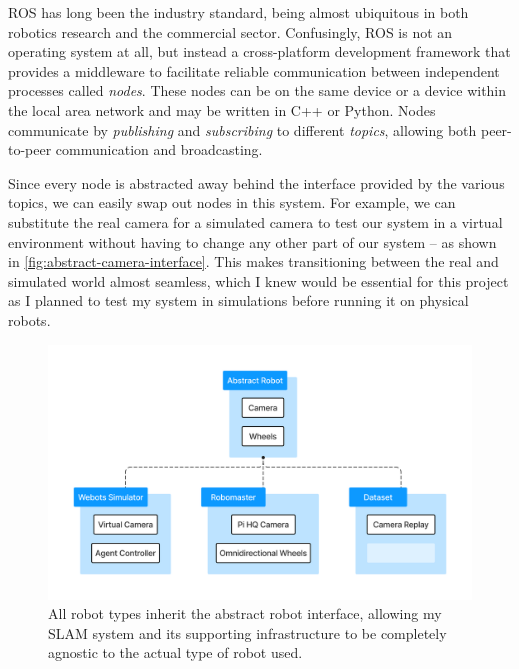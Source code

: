 ROS has long been the industry standard, being almost ubiquitous in both robotics research and the commercial sector. Confusingly, ROS is not an operating system at all, but instead a cross-platform development framework that provides a middleware to facilitate reliable communication between independent processes called \textit{nodes}. These nodes can be on the same device or a device within the local area network and may be written in C++ or Python. Nodes communicate by \textit{publishing} and \textit{subscribing} to different \textit{topics}, allowing both peer-to-peer communication and broadcasting.



Since every node is abstracted away behind the interface provided by the various topics, we can easily swap out nodes in this system. For example, we can substitute the real camera for a simulated camera to test our system in a virtual environment without having to change any other part of our system – as shown in \autoref{fig:abstract-camera-interface}. This makes transitioning between the real and simulated world almost seamless, which I knew would be essential for this project as I planned to test my system in simulations before running it on physical robots.

\begin{figure}[h]
    \centering
    \includegraphics[trim=5cm 5cm 5cm 5cm, scale=0.2]{figures/abstract_camera_interface.pdf}

    \caption{All robot types inherit the abstract robot interface, allowing my SLAM system and its supporting infrastructure to be completely agnostic to the actual type of robot used.}
    \label{fig:abstract-camera-interface}
\end{figure}

